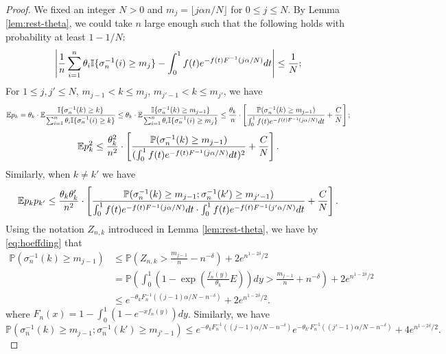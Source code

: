 \documentclass[10pt]{article}
\numberwithin{equation}{section}
\begin{document}
    \begin{proof}
        We fixed an integer $N>0$ and $m_j=\lfloor j \alpha n/N \rfloor$ for $0\leq j\leq N$. 
        By Lemma \ref{lem:rest-theta}, we could take $n$ large enough such that the following holds with probability at least $1-1/N$:
        \begin{equation}
            \left |\frac{1}{n}\sum_{i=1}^n \theta_i \mathbb I\{\sigma^{-1}_n(i)\ge m_j\}- \int_0^1f(t)e^{-f(t)F^{-1}(j\alpha/N)}dt\right|\leq \frac{1}{N};
        \end{equation}
        For $1\leq j,j'\leq N$, $m_{j-1}<k\leq m_j$, $m_{j'-1}<k\le m_{j'}$, we have
        \begin{equation}\label{eq:Epk}
            \mathbb E p_k = \theta_k \cdot \mathbb E \frac{\mathbb I\{\sigma^{-1}_n(k)\ge k\}}{\sum_{i=1}^n \theta_i \mathbb I\{\sigma^{-1}_n(i)\ge k\}} \leq  \theta_k \cdot \mathbb E \frac{\mathbb I\{\sigma^{-1}_n(k)\ge m_{j-1}\}}{\sum_{i=1}^n \theta_i \mathbb I\{\sigma^{-1}_n(i)\ge m_{j}\}}\leq \frac{\theta_k}{n} \cdot\left [ \frac{\mathbb P(\sigma_n^{-1}(k)\ge m_{j-1})}{\int_0^1f(t)e^{-f(t)F^{-1}(j\alpha/N)}dt} + \frac{C}{N} \right];
        \end{equation}
        \begin{equation}\label{eq:Epk2}
            \mathbb E p_k ^2 \leq \frac{\theta_k^2}{n^2} \cdot\left [ \frac{\mathbb P(\sigma_n^{-1}(k)\ge m_{j-1})}{(\int_0^1f(t)e^{-f(t)F^{-1}(j\alpha/N)}dt)^2} + \frac{C}{N} \right].
        \end{equation}
        Similarly, when $k\neq k'$ we have
        \begin{equation}\label{eq:Epkpk'}
            \mathbb E p_k p_{k'} \leq \frac{\theta_k \theta_k'}{n^2} \cdot\left [ \frac{\mathbb P(\sigma_n^{-1}(k)\ge m_{j-1};\sigma_n^{-1}(k')\ge m_{j'-1})}{\int_0^1f(t)e^{-f(t)F^{-1}(j\alpha/N)}dt\cdot \int_0^1f(t)e^{-f(t)F^{-1}(j'\alpha/N)}dt} + \frac{C}{N} \right].
        \end{equation}
        Using the notation $Z_{n,k}$ introduced in Lemma \ref{lem:rest-theta}, we have by \eqref{eq:hoeffding} that
        \begin{align}
            \mathbb P(\sigma^{-1}_n(k)\ge m_{j-1})
            &\leq \mathbb P(Z_{n,k}> \frac{m_{j-1}}{n}-n^{-\delta})+2e^{n^{1-2\delta}/2}\\
            &=\mathbb P(\int_0^1(1-\exp(\frac{f_n(y)}{\theta_k}E))dy>\frac{m_{j-1}}{n}+n^{-\delta})+2e^{n^{1-2\delta}/2}\\
            &\le e^{-\theta_k F_n^{-1}((j-1)\alpha/N-n^{-\delta})}+2e^{n^{1-2\delta}/2}.\label{eq:1notoccur}
        \end{align}
        where $F_n(x)=1-\int_0^1 (1- e^{-xf_n(y)})dy$. Similarly, we have
        \begin{equation}\label{eq:2notoccur}
            \mathbb P(\sigma^{-1}_n(k)\ge m_{j-1};\sigma^{-1}_n(k')\ge m_{j'-1})\leq  e^{-\theta_k F_n^{-1}((j-1)\alpha/N-n^{-\delta})} e^{-\theta_{k'} F_n^{-1}((j'-1)\alpha/N-n^{-\delta})}+4e^{n^{1-2\delta}/2}.
        \end{equation}
        

\end{proof}
\end{document}

